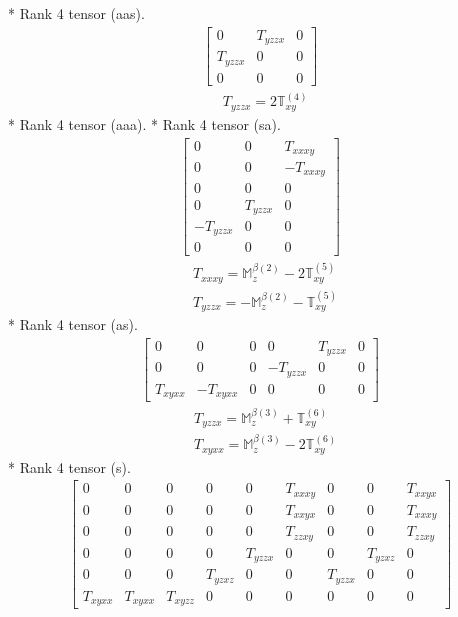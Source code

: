 \documentclass[fleqn,8pt,landscape]{jsarticle}
\begin{document}
* Rank 4 tensor (aas).
\begin{align*}
\begin{bmatrix} 0 & T_{yzzx} & 0 \\ T_{yzzx} & 0 & 0 \\ 0 & 0 & 0 \end{bmatrix}
\end{align*}
\begin{align*}
& T_{yzzx} = 2 \mathbb{T}_{xy}^{(4)}
\end{align*}
* Rank 4 tensor (aaa).
* Rank 4 tensor (sa).
\begin{align*}
\begin{bmatrix} 0 & 0 & T_{xxxy} \\ 0 & 0 & - T_{xxxy} \\ 0 & 0 & 0 \\ 0 & T_{yzzx} & 0 \\ - T_{yzzx} & 0 & 0 \\ 0 & 0 & 0 \end{bmatrix}
\end{align*}
\begin{align*}
& T_{xxxy} = \mathbb{M}_{z}^{\beta(2)} - 2 \mathbb{T}_{xy}^{(5)} \\
& T_{yzzx} = - \mathbb{M}_{z}^{\beta(2)} - \mathbb{T}_{xy}^{(5)}
\end{align*}
* Rank 4 tensor (as).
\begin{align*}
\begin{bmatrix} 0 & 0 & 0 & 0 & T_{yzzx} & 0 \\ 0 & 0 & 0 & - T_{yzzx} & 0 & 0 \\ T_{xyxx} & - T_{xyxx} & 0 & 0 & 0 & 0 \end{bmatrix}
\end{align*}
\begin{align*}
& T_{yzzx} = \mathbb{M}_{z}^{\beta(3)} + \mathbb{T}_{xy}^{(6)} \\
& T_{xyxx} = \mathbb{M}_{z}^{\beta(3)} - 2 \mathbb{T}_{xy}^{(6)}
\end{align*}
* Rank 4 tensor (s).
\begin{align*}
\begin{bmatrix} 0 & 0 & 0 & 0 & 0 & T_{xxxy} & 0 & 0 & T_{xxyx} \\ 0 & 0 & 0 & 0 & 0 & T_{xxyx} & 0 & 0 & T_{xxxy} \\ 0 & 0 & 0 & 0 & 0 & T_{zzxy} & 0 & 0 & T_{zzxy} \\ 0 & 0 & 0 & 0 & T_{yzzx} & 0 & 0 & T_{yzxz} & 0 \\ 0 & 0 & 0 & T_{yzxz} & 0 & 0 & T_{yzzx} & 0 & 0 \\ T_{xyxx} & T_{xyxx} & T_{xyzz} & 0 & 0 & 0 & 0 & 0 & 0 \end{bmatrix}
\end{align*}
\end{document}
